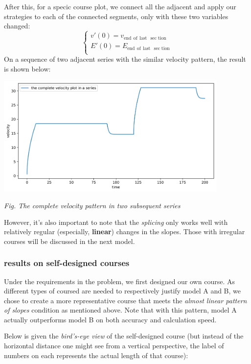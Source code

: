\documentclass{article}
\begin{document}
			After this, for a specic course plot, we connect all the adjacent  and apply our strategies to each of the connected segments, only with these two variables changed:
			$$
			\left\{ \begin{array}{c}
				v\prime\left( 0 \right) =v_{\mathrm{end}\:\:\mathrm{of}\:\:\mathrm{last}\:\:\sec\mathrm{tion}}\\
				E\prime\left( 0 \right) =E_{\mathrm{end}\:\:\mathrm{of}\:\:\mathrm{last}\:\:\sec\mathrm{tion}}\\
			\end{array} \right.
			$$
			On a sequence of two adjacent series with the similar velocity pattern, the result is shown below:
			\begin{center}
				\includegraphics[height=6cm]{the complete velocity pattern in two adjacent series.png}

				\small\textit{Fig. The complete velocity pattern in two subsequent series}
			\end{center}

			However, it's also important to note that the \textit{splicing} only works well with relatively regular (especially, \textbf{linear}) changes in the slopes. Those with irregular courses will be discussed in the next model.


		\subsubsection{results on self-designed courses}
			Under the requirements in the problem, we first designed our own course. As different types of coursed are needed to respectively justify model A and B, we chose to create a more representative course that meets the \textit{almost linear pattern of slopes} condition as mentioned above. Note that with this pattern, model A actually outperforms model B on both accuracy and calculation speed.

			Below is given the \textit{bird's-eye view} of the self-designed course (but instead of the horizontal distance one might see from a vertical perspective, the label of numbers on each  represents the actual length of that course):
\end{document}
